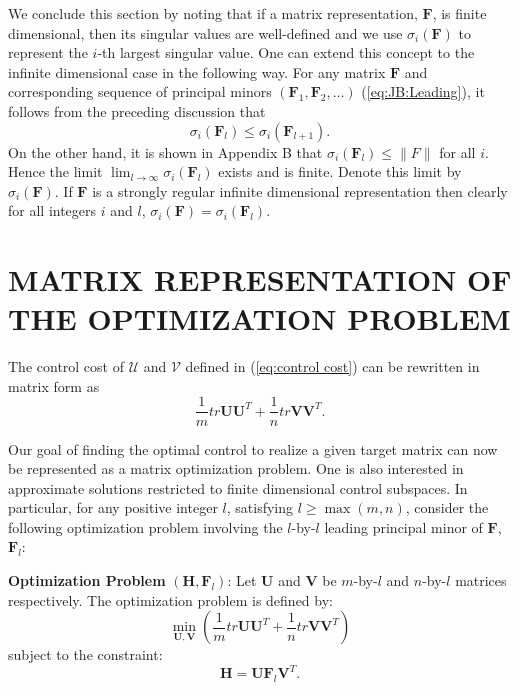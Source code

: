 \documentclass[12pt,onecolumn,draftcls]{IEEEtran}
\newcommand{\bF}{\mathbf{F}}
\begin{document}
We conclude this section by noting that if a matrix representation, $\bF$, is
finite dimensional, then its singular values are well-defined and we use
$\sigma_i(\mathbf{F})$ to represent the $i$-th largest singular value.
One can extend this concept to the infinite dimensional case in the following way.
For any matrix $\bF$ and corresponding sequence of principal minors $(\bF_1, \bF_2,\dots )$ (\ref{eq:JB:Leading}), it follows from the preceding discussion that 
\begin{equation}
\sigma_i(\mathbf{F}_l) \leq \sigma_i(\mathbf{F}_{l+1}).
\end{equation}
On the other hand, it is shown in Appendix B that
$\sigma_i(\mathbf{F}_l) \leq \|F\|$
for all $i$.  Hence the limit
$\lim_{l \rightarrow \infty} \sigma_i(\mathbf{F}_l)$
exists and is finite.  Denote this limit by $\sigma_i(\mathbf{F})$.
If $\bF$  is a strongly regular infinite dimensional representation then clearly
for all integers $i$ and $l$, $
\sigma_i(\mathbf{F}) = \sigma_i(\mathbf{F}_{l}) .
$

\section{MATRIX REPRESENTATION OF THE OPTIMIZATION PROBLEM}\setcounter{equation}{0}

The control cost of $\mathcal{U}$ and $\mathcal{V}$ defined in (\ref{eq:control cost})
can be rewritten in matrix form as
\begin{equation}
\frac{1}{m} tr \mathbf{U} \mathbf{U}^T +
\frac{1}{n}tr \mathbf{V} \mathbf{V}^T. 
\end{equation}

Our goal of finding the optimal control to realize a given target matrix can now
be represented as a matrix optimization problem.   One is also interested in
approximate solutions restricted to finite dimensional control subspaces.
In particular, for any positive integer $l$, satisfying $l \geq \max(m,n)$,
consider the following optimization problem involving the
$l$-by-$l$ leading principal minor of  $\mathbf{F}$, $\mathbf{F}_l$:

\noindent \textbf{Optimization Problem} $(\mathbf{H}, \mathbf{F}_l)$:
Let $\mathbf{U}$ and $\mathbf{V}$ be $m$-by-$l$ and $n$-by-$l$ matrices respectively.
The optimization problem is defined by:
\begin{equation}
\min_{\mathbf{U},\mathbf{V}}  \left( \frac{1}{m} tr \mathbf{U} \mathbf{U}^T +
\frac{1}{n}tr \mathbf{V} \mathbf{V}^T \right)
\end{equation}
subject to the constraint:
\begin{equation}
\mathbf{H}=\mathbf{U}\mathbf{F}_l\mathbf{V}^T.
\end{equation}
\end{document}
